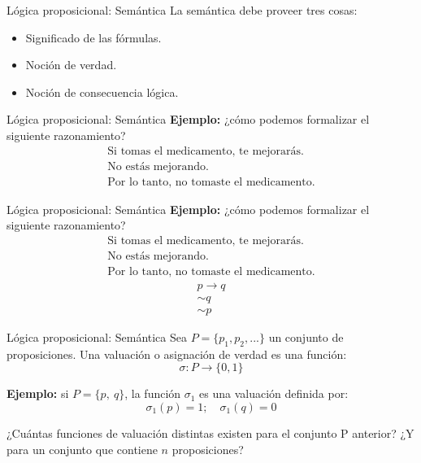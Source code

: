 \documentclass{beamer}
\begin{document}
\begin{frame}{Lógica proposicional: Semántica}
  La semántica debe proveer tres cosas:
  \begin{itemize}
    \item Significado de las fórmulas.
    \item Noción de verdad.
    \item Noción de consecuencia lógica.
  \end{itemize}
\end{frame}


\begin{frame}{Lógica proposicional: Semántica}
  \textbf{Ejemplo:} ¿cómo podemos formalizar el siguiente razonamiento?
  \[
  \begin{array}{c}
    \text{Si tomas el medicamento, te mejorarás.} \\
    \text{No estás mejorando.} \\
    \hline
    \text{Por lo tanto, no tomaste el medicamento.}
  \end{array}
  \]
\end{frame}


\begin{frame}{Lógica proposicional: Semántica}
  \textbf{Ejemplo:} ¿cómo podemos formalizar el siguiente razonamiento?
  \[
    \begin{array}{c}
      \text{Si tomas el medicamento, te mejorarás.} \\
      \text{No estás mejorando.} \\
      \hline
      \text{Por lo tanto, no tomaste el medicamento.}
    \end{array}
  \]
  \vspace{1cm}
  \[
    \begin{array}{c}
      p \rightarrow q \\
      \sim q \\
      \hline
      \sim p
    \end{array}
  \]
\end{frame}


\begin{frame}{Lógica proposicional: Semántica}
  Sea $P = \{p_{1}, p_{2}, ...\}$ un conjunto de proposiciones. Una valuación o asignación de verdad es una función:
  $$\sigma: P \rightarrow \{0, 1\}$$

  \textbf{Ejemplo:} si $P = \{p,\ q\}$, la función $\sigma_{1}$ es una valuación
  definida por:
  $$\sigma_{1}(p) = 1; \quad \sigma_{1}(q) = 0$$

  ¿Cuántas funciones de valuación distintas existen para el conjunto P anterior? ¿Y para un conjunto que contiene $n$ proposiciones?
\end{frame}
\end{document}
